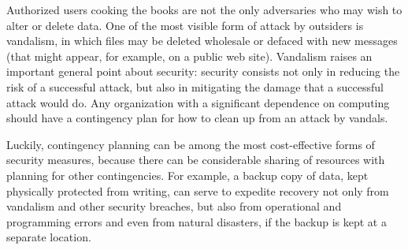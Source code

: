 Authorized users cooking the books are not the only adversaries who
may wish to alter or delete data.  One of the most visible form of
attack by outsiders is vandalism, in which files may be deleted
wholesale or defaced with new messages (that might appear, for example, on a public web site).  Vandalism
raises an important general point about security: security consists
not only in reducing the risk of a successful attack, but also in
mitigating the damage that a successful attack would do.  Any
organization with a significant dependence on computing should have a
contingency plan for how to clean up from an attack by vandals.

Luckily, contingency planning can be among the most cost-effective
forms of security measures, because there can be considerable sharing
of resources with planning for other contingencies.  For example, a
backup copy of data, kept physically protected from writing, can serve
to expedite recovery not only from vandalism and other security
breaches, but also from operational and programming errors and even
from natural disasters, if the backup is kept at a separate location.


